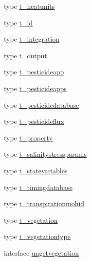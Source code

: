\begin{DoxyCompactItemize}
type \mbox{\hyperlink{structmodulevegetation_1_1t__heatunits}{t\+\_\+heatunits}}
\item 
type \mbox{\hyperlink{structmodulevegetation_1_1t__id}{t\+\_\+id}}
\item 
type \mbox{\hyperlink{structmodulevegetation_1_1t__integration}{t\+\_\+integration}}
\item 
type \mbox{\hyperlink{structmodulevegetation_1_1t__output}{t\+\_\+output}}
\item 
type \mbox{\hyperlink{structmodulevegetation_1_1t__pesticideapp}{t\+\_\+pesticideapp}}
\item 
type \mbox{\hyperlink{structmodulevegetation_1_1t__pesticideapps}{t\+\_\+pesticideapps}}
\item 
type \mbox{\hyperlink{structmodulevegetation_1_1t__pesticidedatabase}{t\+\_\+pesticidedatabase}}
\item 
type \mbox{\hyperlink{structmodulevegetation_1_1t__pesticideflux}{t\+\_\+pesticideflux}}
\item 
type \mbox{\hyperlink{structmodulevegetation_1_1t__property}{t\+\_\+property}}
\item 
type \mbox{\hyperlink{structmodulevegetation_1_1t__salinitystressparams}{t\+\_\+salinitystressparams}}
\item 
type \mbox{\hyperlink{structmodulevegetation_1_1t__statevariables}{t\+\_\+statevariables}}
\item 
type \mbox{\hyperlink{structmodulevegetation_1_1t__timingdatabase}{t\+\_\+timingdatabase}}
\item 
type \mbox{\hyperlink{structmodulevegetation_1_1t__transpirationmohid}{t\+\_\+transpirationmohid}}
\item 
type \mbox{\hyperlink{structmodulevegetation_1_1t__vegetation}{t\+\_\+vegetation}}
\item 
type \mbox{\hyperlink{structmodulevegetation_1_1t__vegetationtype}{t\+\_\+vegetationtype}}
\item 
interface \mbox{\hyperlink{interfacemodulevegetation_1_1ungetvegetation}{ungetvegetation}}
\end{DoxyCompactItemize}
